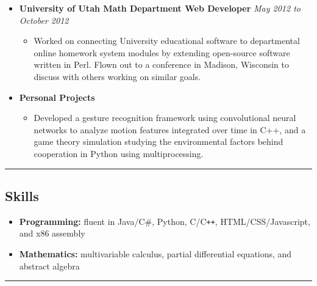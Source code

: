 \documentclass[11pt]{article}
\begin{document}
\begin{itemize}[nolistsep,topsep=0pt, label=]
\item \textbf{University of Utah Math Department Web Developer} \emph{May 2012 to October 2012}

\begin{itemize}[nolistsep,topsep=0pt, label=]
\item Worked on connecting University educational software to departmental online homework system modules by extending open-source software written in Perl. Flown out to a conference in Madison, Wisconsin to discuss with others working on similar goals.
\end{itemize}

\item \textbf{Personal Projects}

\begin{itemize}[nolistsep,topsep=0pt, label=]
\item Developed a gesture recognition framework using convolutional neural networks to analyze motion features integrated over time in C++, and a game theory simulation studying the environmental factors behind cooperation in Python using multiprocessing. 
\end{itemize}
\end{itemize}
\vspace{0.4em}
\hrule
\vspace{-1em}
\subsection*{\textbf{Skills}}
\begin{itemize}[nolistsep,topsep=0pt, label=]
\item \textbf{Programming:} fluent in Java/C\#, Python, C/C{}\verb!++!, HTML/CSS/Javascript, and x86 assembly
\item \textbf{Mathematics:} multivariable calculus, partial differential equations,  and abstract algebra
\end{itemize}
\vspace{0.4em}
\hrule
\end{document}
